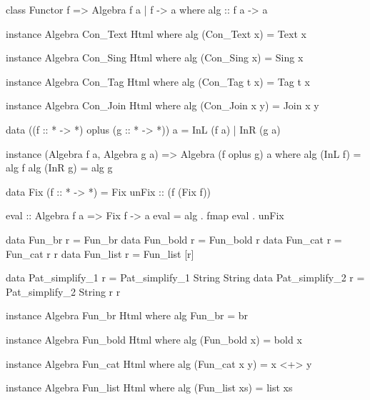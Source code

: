 \begin{code}
class Functor f => Algebra f a | f -> a where
  alg :: f a -> a
\end{code}

\begin{code}
instance Algebra Con_Text Html where
  alg (Con_Text x) = Text x

instance Algebra Con_Sing Html where
  alg (Con_Sing x) = Sing x

instance Algebra Con_Tag Html where
  alg (Con_Tag t x) = Tag t x

instance Algebra Con_Join Html where
  alg (Con_Join x y) = Join x y
\end{code}



\begin{code}
data ((f :: * -> *) oplus (g :: * -> *)) a = InL (f a) | InR (g a)
\end{code}


\begin{code}
instance (Algebra f a, Algebra g a)
  => Algebra (f oplus g) a where
  alg (InL f) = alg f
  alg (InR g) = alg g
\end{code}


\begin{code}
  data Fix (f :: * -> *) = Fix { unFix :: (f (Fix f)) }
\end{code}

\begin{code}
eval :: Algebra f a => Fix f -> a
eval = alg . fmap eval . unFix
\end{code}


\begin{code}
data Fun_br     r = Fun_br
data Fun_bold   r = Fun_bold r
data Fun_cat    r = Fun_cat r r
data Fun_list   r = Fun_list [r]
\end{code}

\begin{code}
data Pat_simplify_1 r = Pat_simplify_1 String String
data Pat_simplify_2 r = Pat_simplify_2 String r r
\end{code}

\begin{code}
instance Algebra Fun_br Html where
  alg Fun_br = br

instance Algebra Fun_bold Html where
  alg (Fun_bold x) = bold x

instance Algebra Fun_cat Html where
  alg (Fun_cat x y) = x <+> y

instance Algebra Fun_list Html where
  alg (Fun_list xs) = list xs
\end{code}

